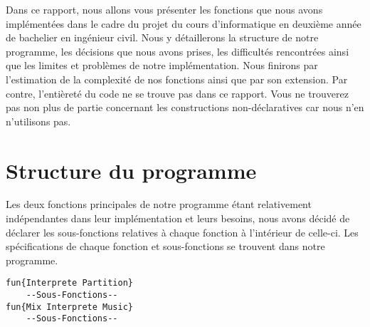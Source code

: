 \documentclass[a4paper,12pt]{report}
\begin{document}


\vspace*{5cm}
Dans ce rapport, nous allons vous présenter les fonctions que nous avons implémentées dans le cadre du projet du cours d'informatique en deuxième année de bachelier en ingénieur civil. Nous y détaillerons la structure de notre programme, les décisions que nous avons prises, les difficultés rencontrées ainsi que les limites et problèmes de notre implémentation. Nous finirons par l'estimation de la complexité de nos fonctions ainsi que par son extension. Par contre, l'entièreté du code ne se trouve pas dans ce rapport. Vous ne trouverez pas non plus de partie concernant les constructions non-déclaratives car nous n'en n'utilisons pas.

\section*{Structure du programme}
Les deux fonctions principales de notre programme étant relativement indépendantes dans leur implémentation et leurs besoins, nous avons décidé de déclarer les sous-fonctions relatives à chaque fonction à l'intérieur de celle-ci.
Les spécifications de chaque fonction et sous-fonctions se trouvent dans notre programme.

\begin{lstlisting}[frame=single] 
fun{Interprete Partition}
	--Sous-Fonctions--
fun{Mix Interprete Music}
	--Sous-Fonctions--
\end{lstlisting}
\newpage
\end{document}
